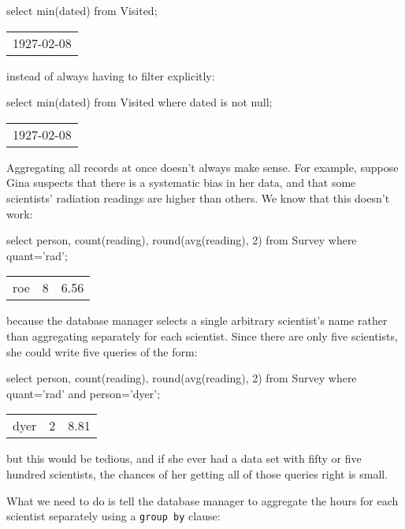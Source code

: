 \documentclass{book}
\begin{document}
\begin{VerbIn}
select min(dated) from Visited;
\end{VerbIn}

\begin{tabular}{l}
1927-02-08 \\
\end{tabular}

instead of always having to filter explicitly:

\begin{VerbIn}
select min(dated) from Visited where dated is not null;
\end{VerbIn}

\begin{tabular}{l}
1927-02-08 \\
\end{tabular}

Aggregating all records at once doesn't always make sense. For example,
suppose Gina suspects that there is a systematic bias in her data, and
that some scientists' radiation readings are higher than others. We know
that this doesn't work:

\begin{VerbIn}
select person, count(reading), round(avg(reading), 2)
from  Survey
where quant='rad';
\end{VerbIn}

\begin{tabular}{lll}
roe & 8 & 6.56 \\
\end{tabular}

because the database manager selects a single arbitrary scientist's name
rather than aggregating separately for each scientist. Since there are
only five scientists, she could write five queries of the form:

\begin{VerbIn}
select person, count(reading), round(avg(reading), 2)
from  Survey
where quant='rad'
and   person='dyer';
\end{VerbIn}

\begin{tabular}{lll}
dyer & 2 & 8.81 \\
\end{tabular}

but this would be tedious, and if she ever had a data set with fifty or
five hundred scientists, the chances of her getting all of those queries
right is small.

What we need to do is tell the database manager to aggregate the hours
for each scientist separately using a \texttt{group by} clause:
\end{document}
